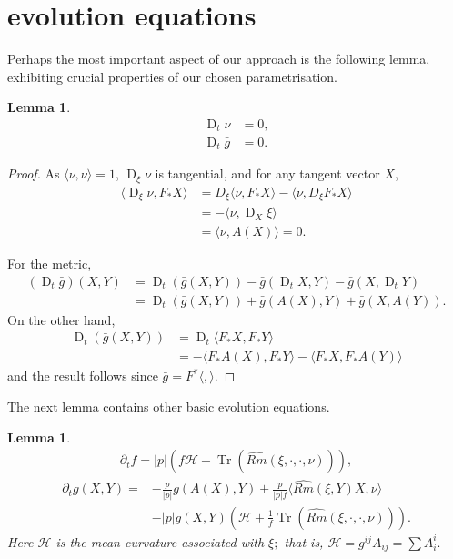 \documentclass{amsart}
\newtheorem{lemma}[theorem]{Lemma}
\theoremstyle{definition}
\theoremstyle{remark}
\newcommand{\ip}[2]{\ensuremath{\langle{#1},{#2}\rangle}}
\DeclareMathOperator{\Tr}{Tr}
\DeclareMathOperator{\D}{D}
\numberwithin{equation}{section}
\begin{document}
\section{evolution equations}

Perhaps the most important aspect of our approach is the following lemma, exhibiting crucial properties of our chosen parametrisation.

\begin{lemma}
\begin{align}
\D_t \nu & = 0, \\
\D_t \bar{g} &= 0.
\end{align}
\end{lemma}

\begin{proof}
As $\ip{\nu}{\nu} = 1$, $\D_{\xi} \nu$ is tangential, and for any tangent vector $X$,
\[
\begin{split}
\ip{\D_{\xi} \nu}{F_{\ast} X} &= D_{\xi} \ip{\nu}{F_{\ast}X} - \ip{\nu}{D_{\xi} F_{\ast} X} \\
&= -\ip{\nu}{\D_{X}\xi} \\
&= \ip{\nu}{A(X)} = 0.
\end{split}
\]

For the metric,
\[
\begin{split}
\left(\D_t \bar{g}\right) (X, Y) &= \D_t (\bar{g}(X, Y)) - \bar{g}(\D_t X, Y) - \bar{g}(X, \D_t Y) \\
&= \D_t (\bar{g}(X, Y)) + \bar{g}(A(X), Y) + \bar{g}(X, A(Y)).
\end{split}
\]
On the other hand,
\[
\begin{split}
\D_t (\bar{g}(X, Y)) &= \D_t \ip{F_{\ast} X}{F_{\ast} Y} \\
&= -\ip{F_{\ast} A(X)}{F_{\ast} Y} - \ip{F_{\ast} X}{F_{\ast} A(Y)}
\end{split}
\]
and the result follows since $\bar{g} = F^{\ast} \ip{}{}$.
\end{proof}

The next lemma contains other basic evolution equations.
\begin{lemma}
\begin{align}
\partial_t f = |p|(f\mathcal{H}+\Tr (\widehat{Rm}(\xi,\cdot,\cdot,\nu))),
\end{align}
\begin{align}
\partial_tg(X,Y)=&-\frac{p}{|p|}g(A(X),Y)+\frac{p}{|p|f}\langle \widehat{Rm}(\xi,Y)X,\nu\rangle\\
&-
|p|g(X,Y)(\mathcal{H}+\frac{1}{f}\Tr (\widehat{Rm}(\xi,\cdot,\cdot,\nu))).\nonumber
\end{align}
Here $\mathcal{H}$ is the mean curvature associated with $\xi;$ that is, $\mathcal{H}=g^{ij} A _{ij}=\sum  A _i^i.$
\end{lemma}
\end{document}
